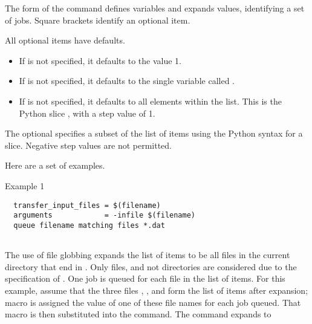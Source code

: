 The form of the  command defines
variables and expands values, 
identifying a set of jobs.
Square brackets identify an optional item.

  

     

      

     

All optional items have defaults.
\begin{itemize}
\item If  is not specified, it defaults to the value 1.
\item If  is not specified, it defaults to the single
variable called .
\item If  is not specified, it defaults to all elements
within the list.  This is the Python slice \Expr{[::]}, with a step
value of 1.
\end{itemize}

The optional  specifies a subset of the list of items
using the Python syntax for a slice.
Negative step values are not permitted.

Here are a set of examples.

\begin{description}
\item[Example 1]
\end{description}
\begin{verbatim}
  transfer_input_files = $(filename)
  arguments            = -infile $(filename)
  queue filename matching files *.dat
    
\end{verbatim}
The use of file globbing expands the list of items to be all files
in the current directory that end in .
Only files, and not directories are considered due to the
specification of .
One job is queued for each file in the list of items.
For this example,
assume that the three files ,
, and  form the list of items 
after expansion;
macro  is assigned the value of one of these file names
for each job queued.
That macro is then substituted into the  command.
The  command expands to

